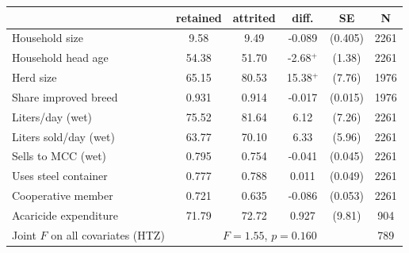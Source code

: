 \begin{tabular}{lccccc}
\hline\hline
 & retained & attrited & diff. & SE & N \\
\hline
Household size & 9.58 & 9.49 & -0.089 & (0.405) & 2261 \\
Household head age & 54.38 & 51.70 & -2.68$^{+}$ & (1.38) & 2261 \\
Herd size & 65.15 & 80.53 & 15.38$^{+}$ & (7.76) & 1976 \\
Share improved breed & 0.931 & 0.914 & -0.017 & (0.015) & 1976 \\
Liters/day (wet) & 75.52 & 81.64 & 6.12 & (7.26) & 2261 \\
Liters sold/day (wet) & 63.77 & 70.10 & 6.33 & (5.96) & 2261 \\
Sells to MCC (wet) & 0.795 & 0.754 & -0.041 & (0.045) & 2261 \\
Uses steel container & 0.777 & 0.788 & 0.011 & (0.049) & 2261 \\
Cooperative member & 0.721 & 0.635 & -0.086 & (0.053) & 2261 \\
Acaricide expenditure & 71.79 & 72.72 & 0.927 & (9.81) & 904 \\
\hline
Joint $F$ on all covariates (HTZ) & \multicolumn{4}{c}{$F = 1.55$, $p = 0.160$} & 789 \\
\hline\hline
\end{tabular}
